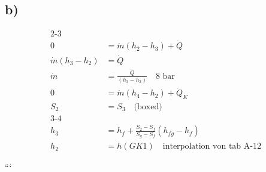 

\subsection*{b)}

\begin{align*}
    \text{2-3} \quad & \\
    0 &= \dot{m} (h_2 - h_3) + \dot{Q} \\
    \dot{m} (h_3 - h_2) &= \dot{Q} \\
    \dot{m} &= \frac{\dot{Q}}{(h_3 - h_2)} \quad \text{8 bar} \\
    0 &= \dot{m} (h_4 - h_2) + \dot{Q}_K \\
    S_2 &= S_3 \quad \text{(boxed)} \\
    \text{3-4} \quad & \\
    h_3 &= h_f + \frac{S_2 - S_f}{S_g - S_f} (h_{fg} - h_f) \\
    h_2 &= h(GK1) \quad \text{interpolation von tab A-12}
\end{align*}

```